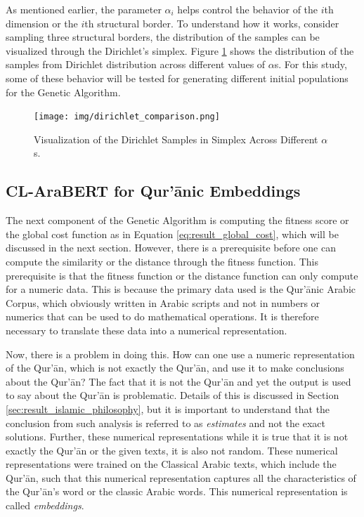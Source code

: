 As mentioned earlier, the parameter $\alpha_i$ helps control the behavior of the $i$th dimension or the $i$th structural border. To understand how it works, consider sampling three structural borders, the distribution of the samples can be visualized through the Dirichlet's simplex. Figure \ref{fig:result_dirichlet_simplex} shows the distribution of the samples from Dirichlet distribution across different values of $\alpha$s. For this study, some of these behavior will be tested for generating different initial populations for the Genetic Algorithm.

\begin{figure}[!t]
    \centering
    \texttt{[image: img/dirichlet\_comparison.png]}
    \caption{Visualization of the Dirichlet Samples in Simplex Across Different $\alpha$s.}
    \label{fig:result_dirichlet_simplex}
\end{figure}
\subsection{CL-AraBERT for Qur'\=anic Embeddings}
The next component of the Genetic Algorithm is computing the fitness score or the global cost function as in Equation \ref{eq:result_global_cost}, which will be discussed in the next section. However, there is a prerequisite before one can compute the similarity or the distance through the fitness function. This prerequisite is that the fitness function or the distance function can only compute for a numeric data. This is because the primary data used is the Qur'\=anic Arabic Corpus, which obviously written in Arabic scripts and not in numbers or numerics that can be used to do mathematical operations. It is therefore necessary to translate these data into a numerical representation. 

Now, there is a problem in doing this. How can one use a numeric representation of the Qur'\=an, which is not exactly the Qur'\=an, and use it to make conclusions about the Qur'\=an? The fact that it is not the Qur'\=an and yet the output is used to say about the Qur'\=an is problematic. Details of this is discussed in Section \ref{sec:result_islamic_philosophy}, but it is important to understand that the conclusion from such analysis is referred to as \textit{estimates} and not the exact solutions. Further, these numerical representations while it is true that it is not exactly the Qur'\=an or the given texts, it is also not random. These numerical representations were trained on the Classical Arabic texts, which include the Qur'\=an, such that this numerical representation captures all the characteristics of the Qur'\=an's word or the classic Arabic words. This numerical representation is called \textit{embeddings}.

